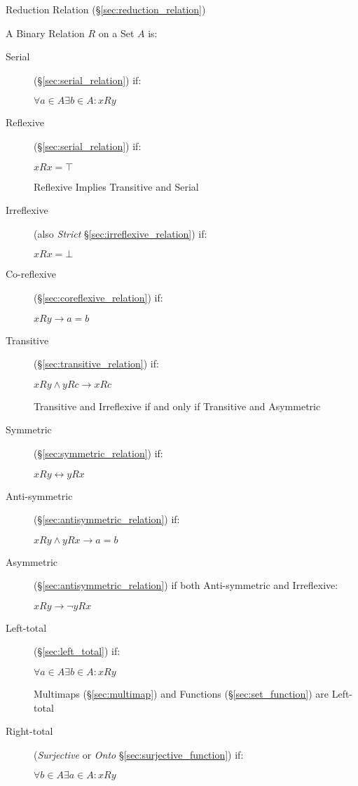 Reduction Relation (\S\ref{sec:reduction_relation})

A Binary Relation $R$ on a Set $A$ is:
\begin{description}
\item[Serial](\S\ref{sec:serial_relation}) if:

  $ \forall a \in A \exists b \in A : xRy $

\item[Reflexive](\S\ref{sec:serial_relation}) if:

  $ xRx = \top $

  Reflexive Implies Transitive and Serial

\item[Irreflexive] (also \emph{Strict}
  \S\ref{sec:irreflexive_relation}) if:

  $ xRx = \bot $

\item[Co-reflexive](\S\ref{sec:coreflexive_relation}) if:

  $ xRy \to a = b $

\item[Transitive](\S\ref{sec:transitive_relation}) if:

  $ xRy \wedge yRc \to xRc $

  Transitive and Irreflexive if and only if Transitive and Asymmetric

\item[Symmetric](\S\ref{sec:symmetric_relation}) if:

  $ xRy \leftrightarrow yRx $

\item[Anti-symmetric](\S\ref{sec:antisymmetric_relation}) if:

  $ xRy \wedge yRx \to a = b $

\item[Asymmetric](\S\ref{sec:antisymmetric_relation}) if both
  Anti-symmetric and Irreflexive:

  $ xRy \to \neg yRx $

\item[Left-total] (\S\ref{sec:left_total}) if:

  $ \forall a \in A \exists b \in A : xRy $

  Multimaps (\S\ref{sec:multimap}) and Functions
  (\S\ref{sec:set_function}) are Left-total

\item[Right-total] (\emph{Surjective} or \emph{Onto}
  \S\ref{sec:surjective_function}) if:

  $ \forall b \in A \exists a \in A : xRy $


\end{description}
